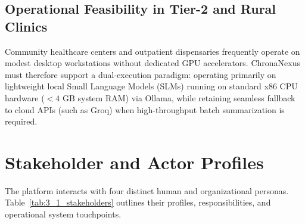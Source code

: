 \subsection{Operational Feasibility in Tier-2 and Rural Clinics}
Community healthcare centers and outpatient dispensaries frequently operate on modest desktop workstations without dedicated GPU accelerators. ChronaNexus must therefore support a dual-execution paradigm: operating primarily on lightweight local Small Language Models (SLMs) running on standard x86 CPU hardware ($<4\text{ GB}$ system RAM) via Ollama, while retaining seamless fallback to cloud APIs (such as Groq) when high-throughput batch summarization is required.


\section{Stakeholder and Actor Profiles}
\label{sec:sys_stakeholders}

The platform interacts with four distinct human and organizational personas. Table~\ref{tab:3_1_stakeholders} outlines their profiles, responsibilities, and operational system touchpoints.

